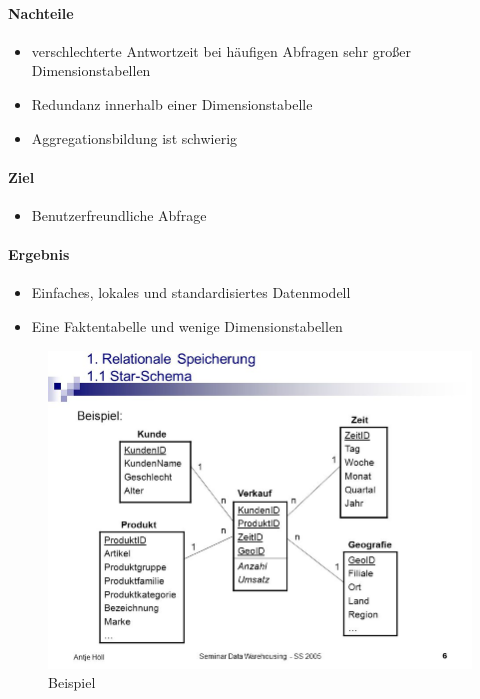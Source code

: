 \paragraph{Nachteile}
\begin{itemize}
    \item verschlechterte Antwortzeit bei häufigen Abfragen sehr großer Dimensionstabellen 
    \item Redundanz innerhalb einer Dimensionstabelle
    \item Aggregationsbildung ist schwierig
    
\end{itemize}

\paragraph{Ziel}
\begin{itemize}
    \item Benutzerfreundliche Abfrage 
\end{itemize}

\paragraph{Ergebnis}
\begin{itemize}
    \item Einfaches, lokales und standardisiertes Datenmodell
    \item Eine Faktentabelle und wenige Dimensionstabellen    
\end{itemize}

\begin{figure}[h]
    \centering
    \includegraphics[width=.8\textwidth]{Content/images/modellierung/star2.png}
    \caption{Beispiel}
    \label{fig:modellierung:star2}
\end{figure}

